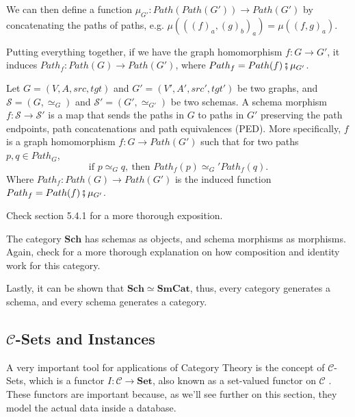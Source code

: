 We can then define a function $\mu_{G'}:Path(Path(G'))\to Path(G')$ by concatenating
the paths of paths, e.g. $\mu(((f)_a, (g)_b)_a) = \mu((f,g)_a)$.

Putting everything together, if we have the graph homomorphism $f:G\to G'$,
it induces $Path_f: Path(G) \to Path(G')$, where
$Path_f = Path(f) \fatsemi \mu_{G'}$.


\begin{definition}
  Let $G = (V,A,src,tgt)$ and $G'=(V',A',src',tgt')$ be two graphs, and
  $\mathcal S = (G,\simeq_G)$ and $\mathcal S' = (G', \simeq_{G'})$ be two schemas.
  A schema morphism $f:\mathcal S \to \mathcal S'$ is a map that sends
  the paths in $G$ to paths in $G'$ preserving the path endpoints, path concatenations
  and path equivalences (PED).
  More specifically, $f$ is a graph homomorphism $f:G \to Path(G')$
  such that for two paths $p,q \in Path_G$,
  \begin{displaymath}
    \text{if } p \simeq_G q, \ \text{then }  Path_f(p) \simeq_G' Path_f(q).
  \end{displaymath}
  Where $Path_f:Path(G) \to Path(G')$ is the induced function $Path_f = Path(f) \fatsemi \mu_{G'}$.

  Check \citet{spivak2014category} section 5.4.1 for a more thorough exposition.
\end{definition}

\begin{definition}
  The category $\mathbf{Sch}$ has schemas as objects, and schema morphisms as morphisms.
  Again, check \citet{spivak2014category} for a more thorough explanation on how composition
  and identity work for this category.
\end{definition}

Lastly, it can be shown that $\mathbf{Sch} \simeq \mathbf{SmCat}$, thus,
every category generates a schema, and every schema generates a category.


\subsection{$\mathcal C$-Sets and Instances}

A very important tool for applications of Category Theory is the
concept of $\mathcal C$-Sets, which is a functor $I:\mathcal C \to \mathbf{Set}$,
also known as a set-valued functor on $\mathcal C$ \citep{fong2019invitation}.
These functors are important because, as we'll see further on this section,
they model the actual data inside a database.

